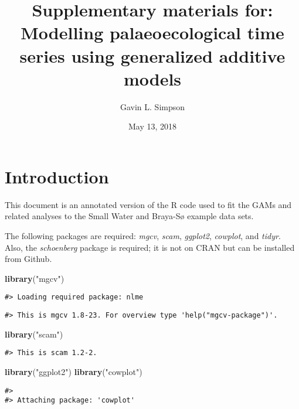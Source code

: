 \documentclass[12pt,]{article}
\title{Supplementary materials for: Modelling palaeoecological time series
using generalized additive models}
\author{Gavin L. Simpson}
\date{May 13, 2018}
\newenvironment{Shaded}{\begin{snugshade}}{\end{snugshade}}
\newcommand{\KeywordTok}[1]{\textcolor[rgb]{0.13,0.29,0.53}{\textbf{{#1}}}}
\newcommand{\StringTok}[1]{\textcolor[rgb]{0.31,0.60,0.02}{{#1}}}
\newcommand{\NormalTok}[1]{{#1}}
\begin{document}
\maketitle

\section{Introduction}\label{introduction}

This document is an annotated version of the R code used to fit the GAMs
and related analyses to the Small Water and Braya-Sø example data sets.

The following packages are required: \emph{mgcv}, \emph{scam},
\emph{ggplot2}, \emph{cowplot}, and \emph{tidyr}. Also, the
\emph{schoenberg} package is required; it is not on CRAN but can be
installed from Github.

\begin{Shaded}
\begin{Highlighting}[]
\KeywordTok{library}\NormalTok{(}\StringTok{"mgcv"}\NormalTok{)}
\end{Highlighting}
\end{Shaded}

\begin{verbatim}
#> Loading required package: nlme
\end{verbatim}

\begin{verbatim}
#> This is mgcv 1.8-23. For overview type 'help("mgcv-package")'.
\end{verbatim}

\begin{Shaded}
\begin{Highlighting}[]
\KeywordTok{library}\NormalTok{(}\StringTok{"scam"}\NormalTok{)}
\end{Highlighting}
\end{Shaded}

\begin{verbatim}
#> This is scam 1.2-2.
\end{verbatim}

\begin{Shaded}
\begin{Highlighting}[]
\KeywordTok{library}\NormalTok{(}\StringTok{"ggplot2"}\NormalTok{)}
\KeywordTok{library}\NormalTok{(}\StringTok{"cowplot"}\NormalTok{)}
\end{Highlighting}
\end{Shaded}

\begin{verbatim}
#> 
#> Attaching package: 'cowplot'
\end{verbatim}
\end{document}
